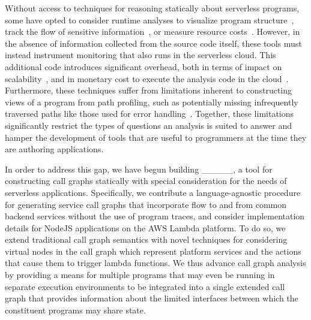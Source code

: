 \documentclass[letterpaper,twocolumn,10pt]{article}
\begin{document}
Without access to techniques for reasoning statically about serverless programs, some have opted to consider runtime analyses to visualize program structure~\cite{lowgo,causalorder}, track the flow of sensitive information~\cite{ifc}, or measure resource costs~\cite{curtain}. However, in the absence of information collected from the source code itself, these tools must instead instrument monitoring that also runs in the serverless cloud. This additional code introduces significant overhead, both in terms of impact on scalability~\cite{causalorder}, and in monetary cost to execute the analysis code in the cloud~\cite{serverlesscost}. Furthermore, these techniques suffer from limitations inherent to constructing views of a program from path profiling, such as potentially missing infrequently traversed paths like those used for error handling~\cite{selectivepaths}. Together, these limitations significantly restrict the types of questions an analysis is suited to answer and hamper the development of tools that are useful to programmers at the time they are authoring applications. \par

In order to address this gap, we have begun building \_\_\_\_\_, a tool for constructing call graphs statically with special consideration for the needs of serverless applications. Specifically, we contribute a language-agnostic procedure for generating service call graphs that incorporate flow to and from common backend services without the use of program traces, and consider implementation details for NodeJS applications on the AWS Lambda platform. To do so, we extend traditional call graph semantics with novel techniques for considering virtual nodes in the call graph which represent platform services and the actions that cause them to trigger lambda functions. We thus advance call graph analysis by providing a means for multiple programs that may even be running in separate execution environments to be integrated into a single extended call graph that provides information about the limited interfaces between which the constituent programs may share state. \par
\end{document}
